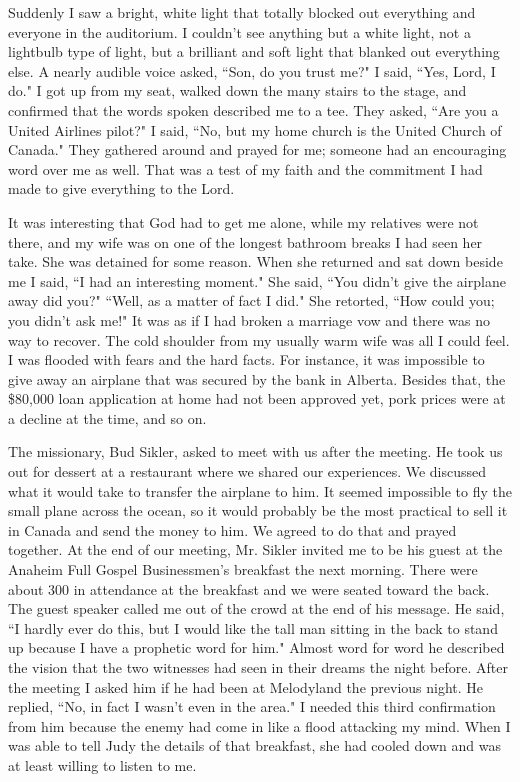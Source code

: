 \documentclass[oneside]{book}
\begin{document}
Suddenly I saw a bright, white light that totally blocked out everything and everyone in the auditorium. I couldn't see anything but a white light, not a lightbulb type of light, but a brilliant and soft light that blanked out everything else. A nearly audible voice asked, ``Son, do you trust me?" I said, ``Yes, Lord, I do." I got up from my seat, walked down the many stairs to the stage, and confirmed that the words spoken described me to a tee. They asked, ``Are you a United Airlines pilot?" I said, ``No, but my home church is the United Church of Canada." They gathered around and prayed for me; someone had an encouraging word over me as well. That was a test of my faith and the commitment I had made to give everything to the Lord.

It was interesting that God had to get me alone, while my relatives were not there, and my wife was on one of the longest bathroom breaks I had seen her take. She was detained for some reason. When she returned and sat down beside me I said, ``I had an interesting moment." She said, ``You didn't give the airplane away did you?" ``Well, as a matter of fact I did." She retorted, ``How could you; you didn't ask me!" It was as if I had broken a marriage vow and there was no way to recover. The cold shoulder from my usually warm wife was all I could feel. I was flooded with fears and the hard facts.  For instance, it was impossible to give away an airplane that was secured by the bank in Alberta. Besides that, the \$80,000 loan application at home had not been approved yet,  pork prices were at a decline at the time, and so on.

The missionary, Bud Sikler, asked to meet with us after the meeting. He took us out for dessert at a restaurant where we shared our experiences. We discussed what it would take to transfer the airplane to him. It seemed impossible to fly the small plane across the ocean, so it would probably be the most practical to sell it in Canada and send the money to him. We agreed to do that and prayed together. At the end of our meeting, Mr. Sikler invited me to be his guest at the Anaheim Full Gospel Businessmen's breakfast the next morning. There were about 300 in attendance at the breakfast and we were seated toward the back. The guest speaker called me out of the crowd at the end of his message. He said, ``I hardly ever do this, but I would like the tall man sitting in the back to stand up because I have a prophetic word for him." Almost word for word he described the vision that the two witnesses had seen in their dreams the night before. After the meeting I asked him if he had been at Melodyland the previous night. He replied, ``No, in fact I wasn't even in the area." I needed this third confirmation from him because the enemy had come in like a flood attacking my mind. When I was able to tell Judy the details of that breakfast, she had cooled down and was at least willing to listen to me.
\end{document}
